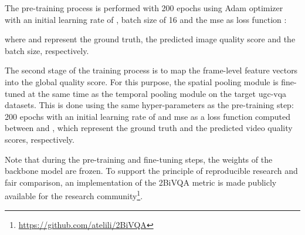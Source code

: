 \documentclass[journal]{IEEEtran}
\begin{document}
\begin{table}[!]
{}
\vspace{1ex}



\vspace{-5mm}
\end{table}
 
The pre-training process is performed with 200 epochs using Adam optimizer~\cite{DBLP:journals/corr/KingmaB14} with an initial learning rate of , batch size of 16 and the \ac{mse} as loss function : 


where  and  represent the ground truth, the predicted image quality score and the batch size, respectively. 

The second stage of the training process is to map the frame-level feature vectors into the global quality score. For this purpose, the spatial pooling module is fine-tuned at the same time as the temporal pooling module on the target \ac{ugc}-\ac{vqa} datasets. This is done using the same hyper-parameters as the pre-training step: 200 epochs with an initial learning rate of  and \ac{mse} as a loss function  computed between  and , which represent the ground truth and the predicted video quality scores, respectively.



Note that during the pre-training and fine-tuning steps, the weights of the backbone model are frozen. To support the principle of reproducible research and fair comparison, an implementation of the 2BiVQA metric is made publicly available for the research community\footnote{\href{https://github.com/atelili/2BiVQA}{https://github.com/atelili/2BiVQA}}.
\end{document}
